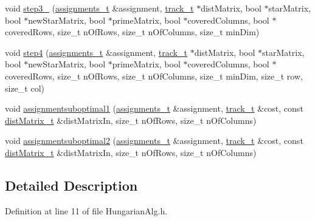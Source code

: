 \begin{DoxyCompactItemize}
\item 
void \mbox{\hyperlink{class_assignment_problem_solver_a8c24dfcfef6adfb96c6394f798c02dba}{step3\+\_}} (\mbox{\hyperlink{_hungarian_alg_8h_ad7b9f569a9adbd958c668a36b6884ffd}{assignments\+\_\+t}} \&assignment, \mbox{\hyperlink{defines_8h_a7ce9c8817b42ab418e61756f579549ab}{track\+\_\+t}} $\ast$dist\+Matrix, bool $\ast$star\+Matrix, bool $\ast$new\+Star\+Matrix, bool $\ast$prime\+Matrix, bool $\ast$covered\+Columns, bool $\ast$covered\+Rows, size\+\_\+t n\+Of\+Rows, size\+\_\+t n\+Of\+Columns, size\+\_\+t min\+Dim)
\item 
void \mbox{\hyperlink{class_assignment_problem_solver_a6ea85d386a136effd84c00f4e2f3cd77}{step4}} (\mbox{\hyperlink{_hungarian_alg_8h_ad7b9f569a9adbd958c668a36b6884ffd}{assignments\+\_\+t}} \&assignment, \mbox{\hyperlink{defines_8h_a7ce9c8817b42ab418e61756f579549ab}{track\+\_\+t}} $\ast$dist\+Matrix, bool $\ast$star\+Matrix, bool $\ast$new\+Star\+Matrix, bool $\ast$prime\+Matrix, bool $\ast$covered\+Columns, bool $\ast$covered\+Rows, size\+\_\+t n\+Of\+Rows, size\+\_\+t n\+Of\+Columns, size\+\_\+t min\+Dim, size\+\_\+t row, size\+\_\+t col)
\item 
void \mbox{\hyperlink{class_assignment_problem_solver_ae8fddfafc7387f3597493f02e8366883}{assignmentsuboptimal1}} (\mbox{\hyperlink{_hungarian_alg_8h_ad7b9f569a9adbd958c668a36b6884ffd}{assignments\+\_\+t}} \&assignment, \mbox{\hyperlink{defines_8h_a7ce9c8817b42ab418e61756f579549ab}{track\+\_\+t}} \&cost, const \mbox{\hyperlink{_hungarian_alg_8h_af6ab0ee8259a51215f62e8f96416d5bb}{dist\+Matrix\+\_\+t}} \&dist\+Matrix\+In, size\+\_\+t n\+Of\+Rows, size\+\_\+t n\+Of\+Columns)
\item 
void \mbox{\hyperlink{class_assignment_problem_solver_a31277dc88cb22e07db1e52b6fe88f84f}{assignmentsuboptimal2}} (\mbox{\hyperlink{_hungarian_alg_8h_ad7b9f569a9adbd958c668a36b6884ffd}{assignments\+\_\+t}} \&assignment, \mbox{\hyperlink{defines_8h_a7ce9c8817b42ab418e61756f579549ab}{track\+\_\+t}} \&cost, const \mbox{\hyperlink{_hungarian_alg_8h_af6ab0ee8259a51215f62e8f96416d5bb}{dist\+Matrix\+\_\+t}} \&dist\+Matrix\+In, size\+\_\+t n\+Of\+Rows, size\+\_\+t n\+Of\+Columns)
\end{DoxyCompactItemize}


\subsection{Detailed Description}


Definition at line 11 of file Hungarian\+Alg.\+h.



